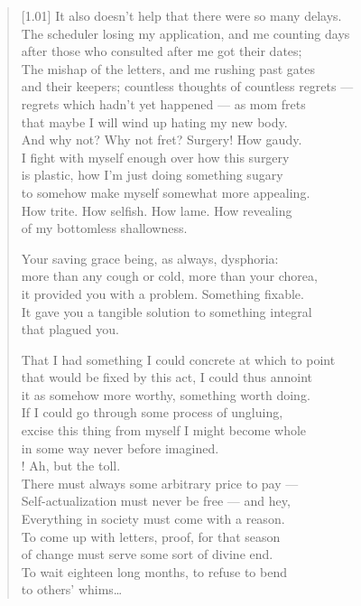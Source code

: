 \begin{verse}[1.01\textwidth]
  It also doesn't help that there were so many delays.\\
  The scheduler losing my application, and me counting days\\
  after those who consulted after me got their dates;\\
  The mishap of the letters, and me rushing past gates\\
  and their keepers; countless thoughts of countless regrets ---\\
  regrets which hadn't yet happened --- as mom frets\\
  that maybe I will wind up hating my new body.\\
  And why not? Why not fret? Surgery! How gaudy.\\
  I fight with myself enough over how this surgery\\
  is plastic, how I'm just doing something sugary\\
  to somehow make myself somewhat more appealing.\\
  How trite. How selfish. How lame. How revealing\\
  of my bottomless shallowness.

\begin{ally}
  \noindent Your saving grace being, as always, dysphoria:\\
  \noindent more than any cough or cold, more than your chorea,\\
  \noindent it provided you with a problem. Something fixable.\\
  \noindent It gave you a tangible solution to something integral\\
  \noindent that plagued you.
\end{ally}

  That I had something I could concrete at which to point\\
  that would be fixed by this act, I could thus annoint\\
  it as somehow more worthy, something worth doing.\\
  If I could go through some process of ungluing,\\
  excise this thing from myself I might become whole\\
  in some way never before imagined.\\!
   Ah, but the toll.\\
  There must always some arbitrary price to pay ---\\
  Self-actualization must never be free --- and hey,\\
  Everything in society must come with a reason.\\
  To come up with letters, proof, for that season\\
  of change must serve some sort of divine end.\\
  To wait eighteen long months, to refuse to bend\\
  to others' whims\ldots{}


\end{verse}
